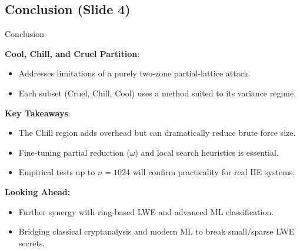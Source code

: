 \documentclass{beamer}
\begin{document}
\subsection*{Conclusion (Slide 4)}
\begin{frame}{Conclusion}

\textbf{Cool, Chill, and Cruel Partition}:
\begin{itemize}
  \item Addresses limitations of a purely two-zone partial-lattice attack.
  \item Each subset (Cruel, Chill, Cool) uses a method suited to its variance regime.
\end{itemize}

\textbf{Key Takeaways}:
\begin{itemize}
  \item The Chill region adds overhead but can dramatically reduce brute force size.
  \item Fine-tuning partial reduction ($\omega$) and local search heuristics is essential.
  \item Empirical tests up to $n=1024$ will confirm practicality for real HE systems.
\end{itemize}

\textbf{Looking Ahead:}
\begin{itemize}
  \item Further synergy with ring-based LWE and advanced ML classification.
  \item Bridging classical cryptanalysis and modern ML to break small/sparse LWE secrets.
\end{itemize}

\end{frame}
\end{document}

